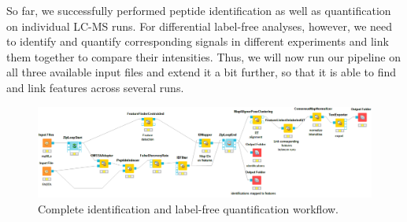 So far, we successfully performed peptide identification as well as quantification on individual LC-MS runs. For differential label-free analyses, however, we need to identify and quantify corresponding signals in different experiments and link them together to compare their intensities. Thus, we will now run our pipeline on all three available input files and extend it a bit further, so that it is able to find and link features across several runs.

\begin{figure}[htbp]
  \centering
  \includegraphics[width=\textwidth]{graphics/labelfree/PepQuantId.png}
  \caption{Complete identification and label-free quantification workflow.}
  \label{fig:complete_without_consensusid}
\end{figure}


